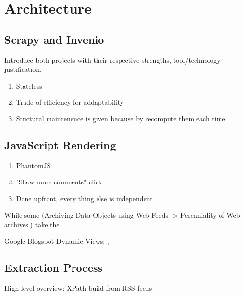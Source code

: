 \section{Architecture}

\subsection{Scrapy and Invenio}
Introduce both projects with their respective strengths, tool/technology justification.

\begin{enumerate}
  \item Stateless
  \item Trade of efficiency for addaptability
  \item Stuctural maintenence is given because by recompute them each time
\end{enumerate}

\subsection{JavaScript Rendering}
\begin{enumerate}
  \item PhantomJS
  \item "Show more comments" click
  \item Done upfront, every thing else is independent
\end{enumerate}

While some (Archiving Data Objects using Web Feeds -> Perenniality of Web archives.) take the


Google Blogspot Dynamic Views: , 

\subsection{Extraction Process}
High level overview: XPath build from RSS feeds
